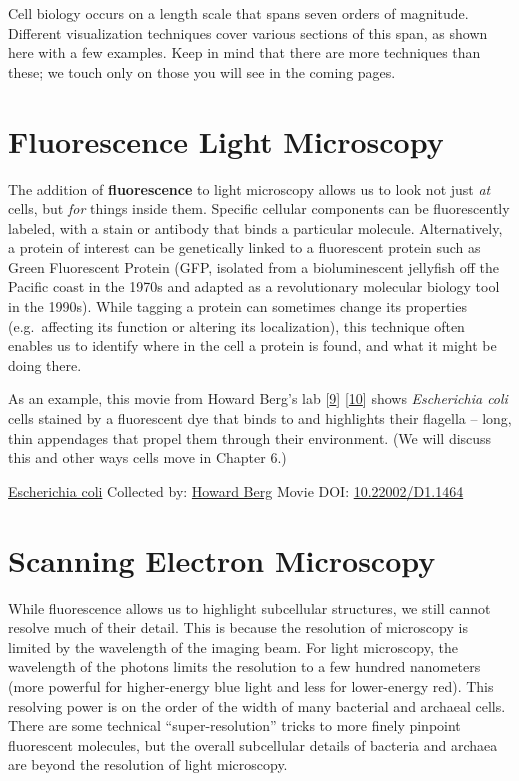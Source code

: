 \documentclass[]{tufte-book}
\begin{document}
Cell biology occurs on a length scale that spans seven orders of magnitude. Different visualization techniques cover various sections of this span, as shown here with a few examples. Keep in mind that there are more techniques than these; we touch only on those you will see in the coming pages.

\hypertarget{fluorescence-light-microscopy}{%
\section{Fluorescence Light Microscopy}\label{fluorescence-light-microscopy}}

The addition of \textbf{fluorescence} to light microscopy allows us to look not just \emph{at} cells, but \emph{for} things inside them. Specific cellular components can be fluorescently labeled, with a stain or antibody that binds a particular molecule. Alternatively, a protein of interest can be genetically linked to a fluorescent protein such as Green Fluorescent Protein (GFP, isolated from a bioluminescent jellyfish off the Pacific coast in the 1970s and adapted as a revolutionary molecular biology tool in the 1990s). While tagging a protein can sometimes change its properties (e.g.~affecting its function or altering its localization), this technique often enables us to identify where in the cell a protein is found, and what it might be doing there.

As an example, this movie from Howard Berg's lab {[}\protect\hyperlink{ref-bergInternet}{9}{]} {[}\protect\hyperlink{ref-turner2000}{10}{]} shows \emph{Escherichia coli} cells stained by a fluorescent dye that binds to and highlights their flagella -- long, thin appendages that propel them through their environment. (We will discuss this and other ways cells move in Chapter 6.)



\hypertarget{htmlwidget-6baf6f588ac67b682c48}{}

\label{fig:1-2}\protect\hyperlink{tree}{Escherichia coli} Collected by: \protect\hyperlink{howard_berg}{Howard Berg} Movie DOI: \href{https://doi.org/10.22002/D1.1464}{10.22002/D1.1464}

\hypertarget{scanning-electron-microscopy}{%
\section{Scanning Electron Microscopy}\label{scanning-electron-microscopy}}

While fluorescence allows us to highlight subcellular structures, we still cannot resolve much of their detail. This is because the resolution of microscopy is limited by the wavelength of the imaging beam. For light microscopy, the wavelength of the photons limits the resolution to a few hundred nanometers (more powerful for higher-energy blue light and less for lower-energy red). This resolving power is on the order of the width of many bacterial and archaeal cells. There are some technical ``super-resolution'' tricks to more finely pinpoint fluorescent molecules, but the overall subcellular details of bacteria and archaea are beyond the resolution of light microscopy.
\end{document}
